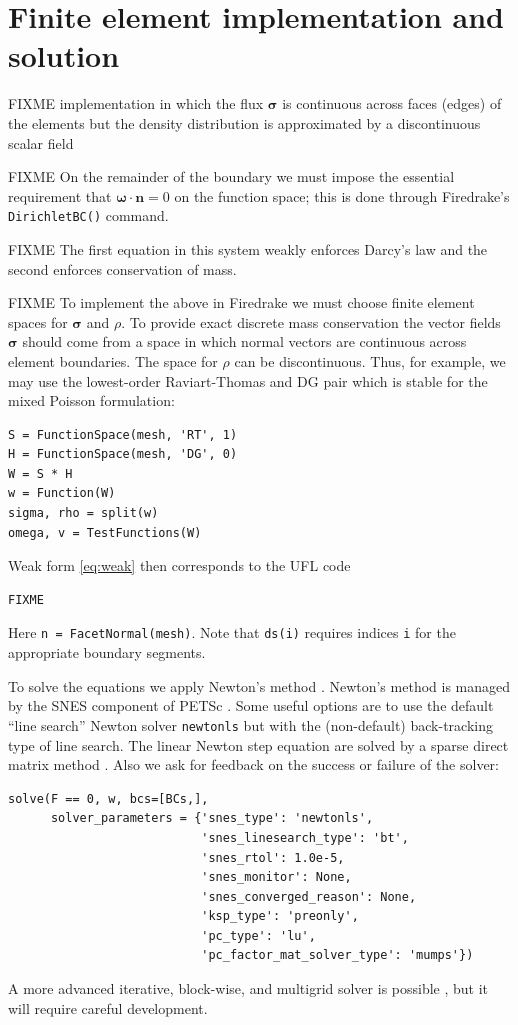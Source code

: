\documentclass[11pt]{amsart}
\newcommand{\bn}{\mathbf{n}}
\newcommand{\bsigma}{\bm{\sigma}}
\newcommand{\bomega}{\bm{\omega}}
\begin{document}
\section{Finite element implementation and solution}

FIXME implementation in which the flux $\bsigma$ is continuous across faces (edges) of the elements but the density distribution is approximated by a discontinuous scalar field

FIXME  On the remainder of the boundary we must impose the essential requirement that $\bomega\cdot \bn=0$ on the function space; this is done through Firedrake's \verb|DirichletBC()| command.

FIXME The first equation in this system weakly enforces Darcy's law and the second enforces conservation of mass.

FIXME To implement the above in Firedrake we must choose finite element spaces for $\bsigma$ and $\rho$.  To provide exact discrete mass conservation the vector fields $\bsigma$ should come from a space in which normal vectors are continuous across element boundaries.  The space for $\rho$ can be discontinuous.  Thus, for example, we may use the lowest-order Raviart-Thomas and DG pair which is stable for the mixed Poisson formulation:
\begin{Verbatim}[fontsize=\small,frame=lines]
S = FunctionSpace(mesh, 'RT', 1)
H = FunctionSpace(mesh, 'DG', 0)
W = S * H
w = Function(W)
sigma, rho = split(w)
omega, v = TestFunctions(W)
\end{Verbatim}
Weak form \eqref{eq:weak} then corresponds to the UFL code
\begin{Verbatim}[fontsize=\small,frame=lines]
FIXME
\end{Verbatim}
Here \verb|n = FacetNormal(mesh)|.  Note that \verb|ds(i)| requires indices \verb|i| for the appropriate boundary segments.

To solve the equations we apply Newton's method \citep{Kelley2003}.  Newton's method is managed by the SNES component of PETSc \citep{Balay2023}.  Some useful options are to use the default ``line search'' Newton solver \texttt{newtonls} but with the (non-default) back-tracking type of line search.  The linear Newton step equation are solved by a sparse direct matrix method \citep{Amestoy2001}.  Also we ask for feedback on the success or failure of the solver:
\begin{Verbatim}[fontsize=\small,frame=lines]
solve(F == 0, w, bcs=[BCs,],
      solver_parameters = {'snes_type': 'newtonls',
                           'snes_linesearch_type': 'bt',
                           'snes_rtol': 1.0e-5,
                           'snes_monitor': None,
                           'snes_converged_reason': None,
                           'ksp_type': 'preonly',
                           'pc_type': 'lu',
                           'pc_factor_mat_solver_type': 'mumps'})
\end{Verbatim}
A more advanced iterative, block-wise, and multigrid solver is possible \citep[e.g.][]{Bueler2021}, but it will require careful development.
\end{document}
